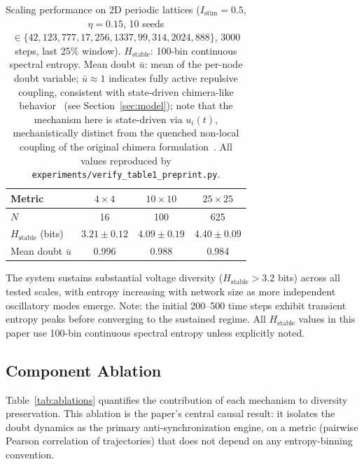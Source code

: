﻿\documentclass[11pt]{article}
\begin{document}
\begin{table}[ht]
\centering
\caption{Scaling performance on 2D periodic lattices ($I_\mathrm{stim}=0.5$, $\eta = 0.15$, 10 seeds $\in\{42,123,777,17,256,1337,99,314,2024,888\}$, 3000 steps, last 25\% window). $H_{\text{stable}}$: 100-bin continuous spectral entropy. Mean doubt $\bar{u}$: mean of the per-node doubt variable; $\bar{u} \approx 1$ indicates fully active repulsive coupling, consistent with state-driven chimera-like behavior~\cite{abrams2004} (see Section~\ref{sec:model}); note that the mechanism here is state-driven via $u_i(t)$, mechanistically distinct from the quenched non-local coupling of the original chimera formulation~\cite{abrams2004}. All values reproduced by \texttt{experiments/verify\_table1\_preprint.py}.}
\label{tab:scaling}
\begin{tabular}{lccc}
\toprule
\textbf{Metric} & \textbf{$4 \times 4$} & \textbf{$10 \times 10$} & \textbf{$25 \times 25$} \\
\midrule
$N$                          & 16   & 100   & 625   \\
$H_{\text{stable}}$ (bits)   & $3.21 \pm 0.12$ & $4.09 \pm 0.19$  & $4.40 \pm 0.09$  \\
Mean doubt $\bar{u}$          & 0.996 & 0.988 & 0.984 \\
\bottomrule
\end{tabular}
\end{table}

The system sustains substantial voltage diversity ($H_{\text{stable}} > 3.2$ bits) across all tested scales, with entropy increasing with network size as more independent oscillatory modes emerge. Note: the initial 200--500 time steps exhibit transient entropy peaks before converging to the sustained regime. All $H_{\text{stable}}$ values in this paper use 100-bin continuous spectral entropy unless explicitly noted.

\subsection{Component Ablation}
\label{sec:ablation}

Table~\ref{tab:ablations} quantifies the contribution of each mechanism to diversity preservation. This ablation is the paper's central causal result: it isolates the doubt dynamics as the primary anti-synchronization engine, on a metric (pairwise Pearson correlation of trajectories) that does not depend on any entropy-binning convention.
\end{document}
